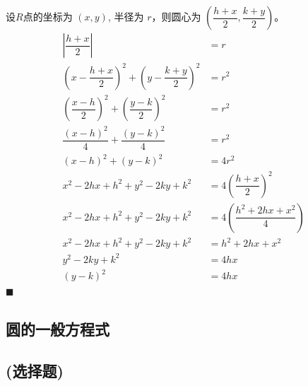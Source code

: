 \documentclass[10pt]{article}
\begin{document}
\begin{enumerate}[leftmargin=*]
        设$R$点的坐标为 $(x, y)$, 半径为 $r$，则圆心为 $\left(\dfrac{h+x}{2}, \dfrac{k+y}{2}\right)$。
        \begin{align*}
          \left|\dfrac{h+x}{2}\right|                                           & = r                                        \\
          \left(x-\dfrac{h+x}{2}\right)^{2} + \left(y-\dfrac{k+y}{2}\right)^{2} & = r^{2}                                    \\
          \left(\dfrac{x-h}{2}\right)^{2} + \left(\dfrac{y-k}{2}\right)^{2}     & = r^{2}                                    \\
          \dfrac{(x-h)^{2}}{4} + \dfrac{(y-k)^{2}}{4}                           & = r^{2}                                    \\
          (x-h)^{2} + (y-k)^{2}                                                 & = 4r^{2}                                   \\
          x^{2} - 2hx + h^{2} + y^{2} - 2ky + k^{2}                             & = 4\left(\dfrac{h+x}{2}\right)^{2}         \\
          x^{2} - 2hx + h^{2} + y^{2} - 2ky + k^{2}                             & = 4\left(\dfrac{h^{2}+2hx+x^{2}}{4}\right) \\
          x^{2} - 2hx + h^{2} + y^{2} - 2ky + k^{2}                             & = h^{2} + 2hx + x^{2}                      \\
          y^{2} - 2ky + k^{2}                                                   & = 4hx                                      \\
          (y-k)^{2}                                                             & = 4hx
        \end{align*} \hfill$\blacksquare$

\end{enumerate}

\subsection{圆的一般方程式}
\subsection*{(选择题)}
\end{document}
